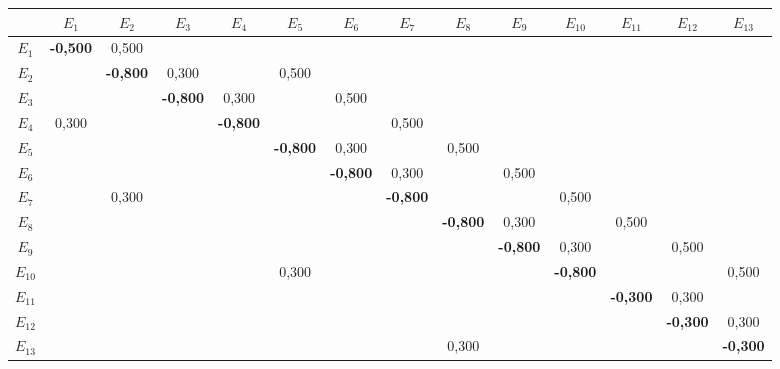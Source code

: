 \begin{tabular}{c|ccccccccccccc}
 & $E_{1}$ & $E_{2}$ & $E_{3}$ & $E_{4}$ & $E_{5}$ & $E_{6}$ & $E_{7}$ & $E_{8}$ & $E_{9}$ & $E_{10}$ & $E_{11}$ & $E_{12}$ & $E_{13}$ \\ \hline
$E_{1}$ & \textbf{-0{,}500} & 0{,}500 &  &  &  &  &  &  &  &  &  &  &  \\
$E_{2}$ &  & \textbf{-0{,}800} & 0{,}300 &  & 0{,}500 &  &  &  &  &  &  &  &  \\
$E_{3}$ &  &  & \textbf{-0{,}800} & 0{,}300 &  & 0{,}500 &  &  &  &  &  &  &  \\
$E_{4}$ & 0{,}300 &  &  & \textbf{-0{,}800} &  &  & 0{,}500 &  &  &  &  &  &  \\
$E_{5}$ &  &  &  &  & \textbf{-0{,}800} & 0{,}300 &  & 0{,}500 &  &  &  &  &  \\
$E_{6}$ &  &  &  &  &  & \textbf{-0{,}800} & 0{,}300 &  & 0{,}500 &  &  &  &  \\
$E_{7}$ &  & 0{,}300 &  &  &  &  & \textbf{-0{,}800} &  &  & 0{,}500 &  &  &  \\
$E_{8}$ &  &  &  &  &  &  &  & \textbf{-0{,}800} & 0{,}300 &  & 0{,}500 &  &  \\
$E_{9}$ &  &  &  &  &  &  &  &  & \textbf{-0{,}800} & 0{,}300 &  & 0{,}500 &  \\
$E_{10}$ &  &  &  &  & 0{,}300 &  &  &  &  & \textbf{-0{,}800} &  &  & 0{,}500 \\
$E_{11}$ &  &  &  &  &  &  &  &  &  &  & \textbf{-0{,}300} & 0{,}300 &  \\
$E_{12}$ &  &  &  &  &  &  &  &  &  &  &  & \textbf{-0{,}300} & 0{,}300 \\
$E_{13}$ &  &  &  &  &  &  &  & 0{,}300 &  &  &  &  & \textbf{-0{,}300} \\
\end{tabular}